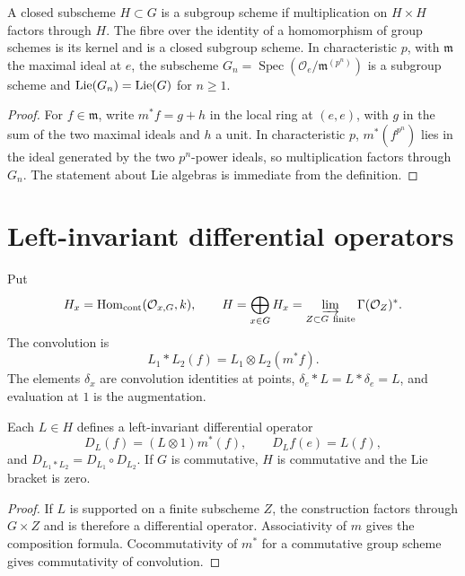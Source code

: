 \begin{definition}
\label{mumford-lem-group-scheme-kernel}
A closed subscheme $H\subset G$ is a subgroup scheme if multiplication on
$H\times H$ factors through $H$. The fibre over the identity of a homomorphism
of group schemes is its kernel and is a closed subgroup scheme.
In characteristic $p$, with $\mathfrak m$ the maximal ideal at $e$, the
subscheme $G_n=\operatorname{Spec}(\mathcal O_e/\mathfrak m^{(p^n)})$ is a
subgroup scheme and $\operatorname{Lie}(G_n)=\operatorname{Lie}(G)$ for $n\ge1$.
\end{definition}
\begin{proof}
For $f\in\mathfrak m$, write $m^*f=g+h$ in the local ring at $(e,e)$,
with $g$ in the sum of the two maximal ideals and $h$ a unit. In
characteristic $p$, $m^*(f^{p^n})$ lies in the ideal generated by the two
$p^n$-power ideals, so multiplication factors through $G_n$. The statement
about Lie algebras is immediate from the definition.
\end{proof}

\section{Left-invariant differential operators}
\label{mumford-III11-hyperalgebra}

\begin{definition}[Hyperalgebra]
\label{mumford-def-hyperalgebra}
Put
\[
H_x=\operatorname{Hom}_{\mathrm{cont}}(\mathcal O_{x,G},k),\qquad
H=\bigoplus_{x\in G}H_x
 =\varinjlim_{Z\subset G\ {\text{finite}}}\Gamma(\mathcal O_Z)^*.
\]
The convolution is
\[
L_1*L_2(f)=L_1\otimes L_2(m^*f).
\]
The elements $\delta_x$ are convolution identities at points,
$\delta_e*L=L*\delta_e=L$, and evaluation at $1$ is the augmentation.
\end{definition}

\begin{proposition}
\label{mumford-prop-hyperalgebra-operators}
Each $L\in H$ defines a left-invariant differential operator
\[
D_L(f)=(L\otimes1)m^*(f),\qquad D_Lf(e)=L(f),
\]
and $D_{L_1*L_2}=D_{L_1}\circ D_{L_2}$. If $G$ is commutative, $H$ is
commutative and the Lie bracket is zero.
\end{proposition}
\begin{proof}
If $L$ is supported on a finite subscheme $Z$, the construction factors
through $G\times Z$ and is therefore a differential operator. Associativity
of $m$ gives the composition formula. Cocommutativity of $m^*$ for a
commutative group scheme gives commutativity of convolution.
\end{proof}

